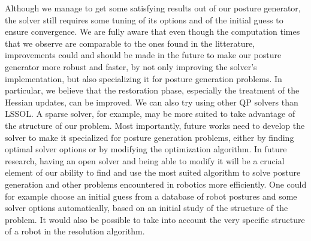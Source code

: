 Although we manage to get some satisfying results out of our posture generator, the solver still requires some tuning of its options and of the initial guess to ensure convergence.
We are fully aware that even though the computation times that we observe are comparable to the ones found in the litterature, improvements could and should be made in the future to make our posture generator more robust and faster, by not only improving the solver's implementation, but also specializing it for posture generation problems.
In particular, we believe that the restoration phase, especially the treatment of the Hessian updates, can be improved.
We can also try using other QP solvers than LSSOL.
A sparse solver, for example, may be more suited to take advantage of the structure of our problem.
Most importantly, future works need to develop the solver to make it specialized for posture generation problems, either by finding optimal solver options or by modifying the optimization algorithm.
In future research, having an open solver and being able to modify it will be a crucial element of our ability to find and use the most suited algorithm to solve posture generation and other problems encountered in robotics more efficiently.
One could for example choose an initial guess from a database of robot postures and some solver options automatically, based on an initial study of the structure of the problem.
It would also be possible to take into account the very specific structure of a robot in the resolution algorithm.


